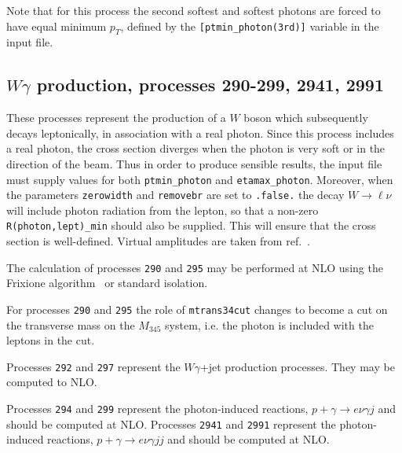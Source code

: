 Note that for this process the second softest and softest photons are forced to have equal minimum $p_T$, defined
by the {\tt{[ptmin\_photon(3rd)]}} variable in the input file.


\subsection{$W\gamma$ production, processes 290-299, 2941, 2991}
\label{subsec:wgamma}

These processes represent the production of a $W$ boson which subsequently
decays leptonically, in association with a real photon.
Since this process includes a real photon, the cross section diverges
when the photon is very soft or in the direction of the beam.
Thus in order to produce sensible results, the input file must supply values for both
{\tt ptmin\_photon} and {\tt etamax\_photon}. Moreover, when the parameters {\tt zerowidth}
and {\tt removebr} are set to {\tt .false.} the decay $W \to \ell \nu$ will include
photon radiation from the lepton, so that a non-zero {\tt R(photon,lept)\_min} should
also be supplied. This will ensure that the cross section is well-defined.
Virtual amplitudes are taken from ref.~\cite{Dixon:1998py}.

The calculation of processes {\tt 290} and {\tt 295} may be performed
at NLO using the Frixione algorithm~\cite{Frixione:1998jh} or standard isolation. 

For processes {\tt 290} and {\tt 295} the role of {\tt mtrans34cut} changes to become a cut 
on the transverse mass on the $M_{345}$ system, i.e. the photon is included with the leptons in the cut. 

Processes {\tt 292} and {\tt 297} represent the $W\gamma$+jet production
processes.  They may be computed to NLO. 

Processes {\tt 294} and {\tt 299} represent the photon-induced reactions,
$p + \gamma \to e \nu \gamma j$ and should be computed at NLO. 
Processes {\tt 2941} and {\tt 2991} represent the photon-induced reactions,
$p + \gamma \to e \nu \gamma j j$ and should be computed at NLO. 


